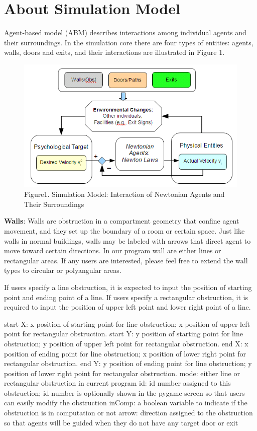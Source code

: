 \documentclass{article}
\begin{document}
\section{About Simulation Model}

Agent-based model (ABM) describes interactions among individual agents and their surroundings.  In the simulation core there are four types of entities: agents, walls, doors and exits, and their interactions are illustrated in Figure 1.  

\begin{figure}
\includegraphics[bb=0bp 0bp 595bp 342bp,clip,scale=0.43]{img/NewtonLaw01}
\caption{Figure1. Simulation Model: Interaction of Newtonian Agents and Their Surroundings}\label{Fig_SimulationModel}
\end{figure}

\textbf{Walls}: Walls are obstruction in a compartment geometry that confine agent movement, and they set up the boundary of a room or certain space.  Just like walls in normal buildings, walls may be labeled with arrows that direct agent to move toward certain directions.  In our program wall are either lines or rectangular areas.  If any users are interested, please feel free to extend the wall types to circular or polyangular areas.

If users specify a line obstruction, it is expected to input the position of starting point and ending point of a line.  If users specify a rectangular obstruction, it is required to input the position of upper left point and lower right point of a line.  

start X: x position of starting point for line obstruction; x position of upper left point for rectangular obstruction.  
start Y: y position of starting point for line obstruction; y position of upper left point for rectangular obstruction.  
end X: x position of ending point for line obstruction; x position of lower right point for rectangular obstruction.  
end Y: y position of ending point for line obstruction; y position of lower right point for rectangular obstruction.  
mode: either line or rectangular obstruction in current program
id: id number assigned to this obstruction; id number is optionally shown in the pygame screen so that users can easily modify the obstruction
inComp: a boolean variable to indicate if the obstruction is in computation or not
arrow: direction assigned to the obstruction so that agents will be guided when they do not have any target door or exit 
\end{document}
